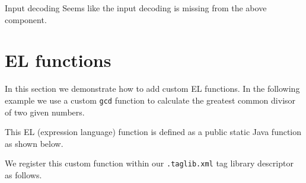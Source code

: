 \begin{TODO}{Input decoding}
	Seems like the input decoding is missing from the above component.
\end{TODO}


\section{EL functions}
In this section we demonstrate how to add custom EL functions.
In the following example we use a custom \texttt{gcd} function to calculate the greatest common divisor of two given numbers.


This EL (expression language) function is defined as a public static Java function as shown below.


We register this custom function within our \texttt{.taglib.xml} tag library descriptor as follows.

